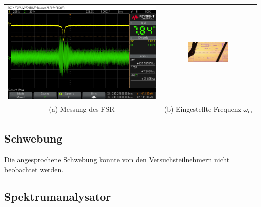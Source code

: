 \begin{center}
    \captionsetup{type=figure}
    \begin{tabular}{c c}
        \includegraphics[scale=0.25]{Bilder/Signal-Rausch/scope_2.png} & \includegraphics[width=0.45\textwidth]{Bilder/Signal-Rausch/signal-rausch_paper_hf-generator.jpg}\\
        (a) Messung des FSR & (b) Eingestellte Frequenz  $\omega_\mathrm{m}$ \\
    \end{tabular}
    \label{fig:specBreite}
\end{center}

\subsection{Schwebung}
\label{sub:schewbung}

Die angesprochene Schwebung konnte von den Versuchsteilnehmern nicht beobachtet werden.

\subsection{Spektrumanalysator}
\label{sub:specAnal}

